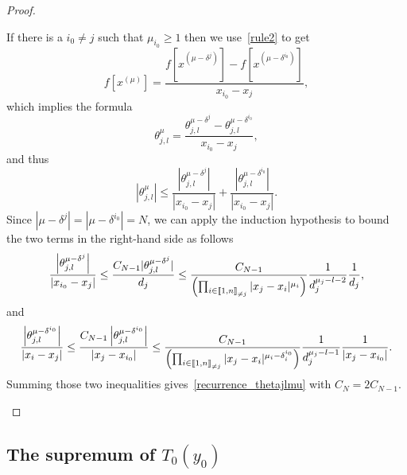 \documentclass[11pt]{article}
\theoremstyle{definition}
\numberwithin{equation}{section}
\numberwithin{figure}{section}
\numberwithin{table}{section}
\newcommand{\llbracket}{\mathopen{[\mkern -2.7mu[}}
\newcommand{\rrbracket}{\mathclose{]\mkern -2.7mu]}}
\newcommand{\interexclu}[3]{\llbracket #1,#2\rrbracket_{\neq #3}}
\begin{document}
\begin{proof}
\begin{itemize}
\begin{itemize}
If there is a $i_0\neq j$ such that $\mu_{i_0}\geq 1$ then we use~\eqref{rule2} to get
\[
f\left[x^{(\mu)}\right] = \frac{f\left[x^{(\mu-\delta^j)}\right] - f\left[x^{(\mu-\delta^{i_0})}\right]}{x_{i_0}-x_j},
\]
which implies the formula
\[
\theta_{j,l}^{\mu} = \frac{\theta_{j,l}^{\mu-\delta^j} - \theta_{j,l}^{\mu-\delta^{i_0}}}{x_{i_0}-x_j},
\]
and thus
\[
\left|\theta_{j,l}^{\mu}\right|\leq \frac{\left|\theta_{j,l}^{\mu-\delta^j}\right|}{\left|x_{i_0}-x_j\right|} + \frac{\left|\theta_{j,l}^{\mu-\delta^{i_0}}\right|}{\left|x_{i_0}-x_j\right|}.
\]
Since $|\mu-\delta^j|=|\mu-\delta^{i_0}|=N$, we can apply the induction hypothesis to bound the two terms in the right-hand side as follows
\begin{equation*}
\frac{\left|\theta_{j,l}^{\mu-\delta^j}\right|}{\left|x_{i_0}-x_j\right|} \leq \frac{C_{N-1} |\theta_{j,l}^{\mu-\delta^j}|}{d_j} \leq \frac{C_{N-1}}{\left(\prod_{i\in\interexclu{1}{n}{j}} |x_j-x_i|^{\mu_i}\right)} \frac{1}{d_j^{\mu_j-l-2}} \frac{1}{d_j},
\end{equation*}
and
\begin{equation*}
\frac{\left|\theta_{j,l}^{\mu-\delta^{i_0}}\right|}{\left|x_i-x_j\right|} \leq \frac{C_{N-1} \left|\theta_{j,l}^{\mu-\delta^{i_0}}\right|}{\left|x_j-x_{i_0}\right|}
\leq \frac{C_{N-1}}{\left(\prod_{i\in\interexclu{1}{n}{j}} |x_j-x_i|^{\mu_i-\delta_i^{i_0}}\right)} \frac{1}{d_j^{\mu_j-l-1}} \frac{1}{|x_j-x_{i_0}|}.
\end{equation*}
Summing those two inequalities gives~\eqref{recurrence_thetajlmu} with $C_N=2C_{N-1}$.\qedhere
\end{itemize}
\end{itemize}
\end{proof}



\subsection{The supremum of \texorpdfstring{$T_0(y_0)$}{T0(F0)}} \label{Subsec:Sup_Tmin}
\end{document}
